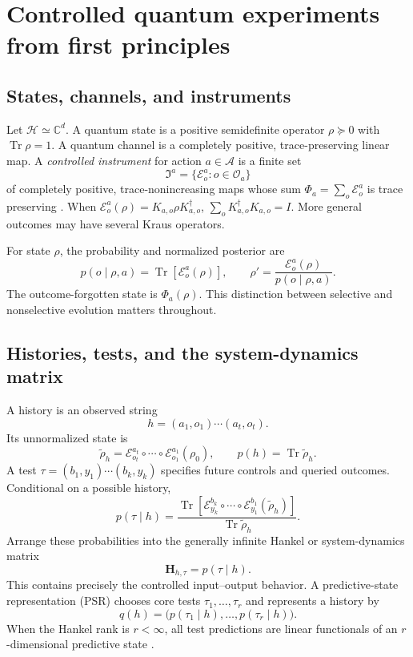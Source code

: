 \documentclass[11pt]{article}
\theoremstyle{definition}
\theoremstyle{remark}
\newcommand{\cH}{\mathcal H}
\newcommand{\cA}{\mathcal A}
\newcommand{\cO}{\mathcal O}
\newcommand{\cE}{\mathcal E}
\newcommand{\Tr}{\operatorname{Tr}}
\newcommand{\C}{\mathbb C}
\begin{document}
\section{Controlled quantum experiments from first principles}

\subsection{States, channels, and instruments}

Let \(\cH\simeq\C^d\). A quantum state is a positive semidefinite operator
\(\rho\succeq0\) with \(\Tr\rho=1\). A quantum channel is a completely
positive, trace-preserving linear map. A \emph{controlled instrument} for
action \(a\in\cA\) is a finite set
\[
\mathfrak I^a=\{\cE^a_o:o\in\cO_a\}
\]
of completely positive, trace-nonincreasing maps whose sum
\(\Phi_a=\sum_o\cE^a_o\) is trace preserving
\cite{Kraus1983,NielsenChuang2010}. When
\(\cE^a_o(\rho)=K_{a,o}\rho K_{a,o}^\dagger\),
\(\sum_oK_{a,o}^\dagger K_{a,o}=I\). More general outcomes may have several
Kraus operators.

For state \(\rho\), the probability and normalized posterior are
\[
p(o\mid \rho,a)=\Tr[\cE^a_o(\rho)],\qquad
\rho'=\frac{\cE^a_o(\rho)}{p(o\mid\rho,a)}.
\]
The outcome-forgotten state is \(\Phi_a(\rho)\). This distinction between
selective and nonselective evolution matters throughout.

\subsection{Histories, tests, and the system-dynamics matrix}

A history is an observed string
\[
h=(a_1,o_1)\cdots(a_t,o_t).
\]
Its unnormalized state is
\[
\widetilde\rho_h=
\cE^{a_t}_{o_t}\circ\cdots\circ\cE^{a_1}_{o_1}(\rho_0),
\qquad p(h)=\Tr\widetilde\rho_h.
\]
A test \(\tau=(b_1,y_1)\cdots(b_k,y_k)\) specifies future controls and queried
outcomes. Conditional on a possible history,
\[
p(\tau\mid h)=
\frac{\Tr[\cE^{b_k}_{y_k}\circ\cdots\circ\cE^{b_1}_{y_1}
(\widetilde\rho_h)]}{\Tr\widetilde\rho_h}.
\]
Arrange these probabilities into the generally infinite Hankel or
system-dynamics matrix
\[
\mathbf H_{h,\tau}=p(\tau\mid h).
\]
This contains precisely the controlled input--output behavior. A
predictive-state representation (PSR) chooses core tests
\(\tau_1,\ldots,\tau_r\) and represents a history by
\[
q(h)=\bigl(p(\tau_1\mid h),\ldots,p(\tau_r\mid h)\bigr).
\]
When the Hankel rank is \(r<\infty\), all test predictions are linear
functionals of an \(r\)-dimensional predictive state \cite{Littman2001}.
\end{document}
